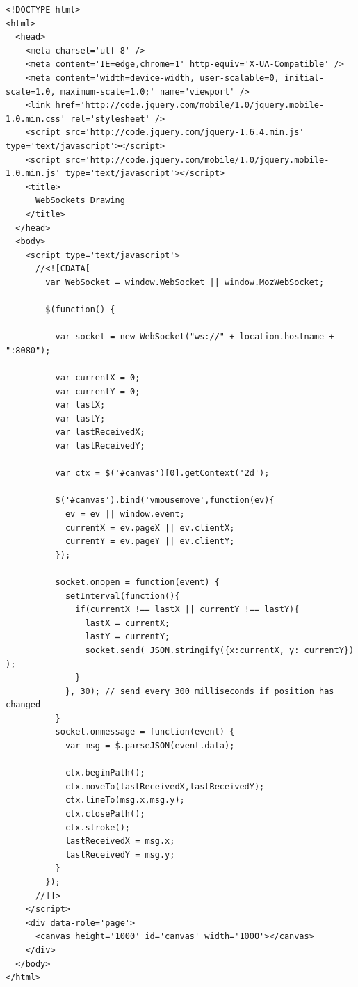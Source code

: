 \begin{verbatim}
<!DOCTYPE html>
<html>
  <head>
    <meta charset='utf-8' />
    <meta content='IE=edge,chrome=1' http-equiv='X-UA-Compatible' />
    <meta content='width=device-width, user-scalable=0, initial-scale=1.0, maximum-scale=1.0;' name='viewport' />
    <link href='http://code.jquery.com/mobile/1.0/jquery.mobile-1.0.min.css' rel='stylesheet' />
    <script src='http://code.jquery.com/jquery-1.6.4.min.js' type='text/javascript'></script>
    <script src='http://code.jquery.com/mobile/1.0/jquery.mobile-1.0.min.js' type='text/javascript'></script>
    <title>
      WebSockets Drawing
    </title>
  </head>
  <body>
    <script type='text/javascript'>
      //<![CDATA[
        var WebSocket = window.WebSocket || window.MozWebSocket;
        
        $(function() {
        
          var socket = new WebSocket("ws://" + location.hostname + ":8080");
         
          var currentX = 0;
          var currentY = 0;
          var lastX;
          var lastY;
          var lastReceivedX;
          var lastReceivedY;
          
          var ctx = $('#canvas')[0].getContext('2d');
        
          $('#canvas').bind('vmousemove',function(ev){
            ev = ev || window.event;
            currentX = ev.pageX || ev.clientX;
            currentY = ev.pageY || ev.clientY;
          });
          
          socket.onopen = function(event) {
            setInterval(function(){
              if(currentX !== lastX || currentY !== lastY){
                lastX = currentX;
                lastY = currentY;
                socket.send( JSON.stringify({x:currentX, y: currentY}) );
              }
            }, 30); // send every 300 milliseconds if position has changed
          }
          socket.onmessage = function(event) {
            var msg = $.parseJSON(event.data);
            
            ctx.beginPath();
            ctx.moveTo(lastReceivedX,lastReceivedY);
            ctx.lineTo(msg.x,msg.y);
            ctx.closePath();
            ctx.stroke();
            lastReceivedX = msg.x;
            lastReceivedY = msg.y;
          }
        });
      //]]>
    </script>
    <div data-role='page'>
      <canvas height='1000' id='canvas' width='1000'></canvas>
    </div>
  </body>
</html>
\end{verbatim}


